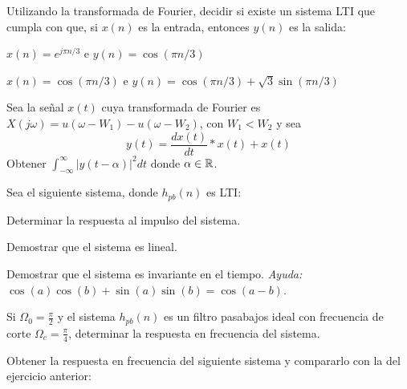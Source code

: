 \begin{ejercicio}
    Utilizando la transformada de Fourier, decidir si existe un sistema LTI que cumpla con que, si $x(n)$ es la entrada, entonces $y(n)$ es la salida:
    
    \inciso $x(n)= e^{j\pi n/3}$ e $y(n) = \cos(\pi n/3)$

    \inciso $x(n) = \cos(\pi n/3)$ e $y(n) = \cos(\pi n/3) + \sqrt{3} \sin(\pi n/3)$
\end{ejercicio}

\begin{ejercicio}
    Sea la señal $x(t)$ cuya transformada de Fourier es $X(j\omega) = u(\omega - W_1) - u(\omega - W_2)$, con $W_1 < W_2$ y sea 
    \begin{equation*}
        y(t) = \frac{dx(t)}{dt} * x(t) + x(t)
    \end{equation*}
    Obtener $\int_{-\infty}^{\infty} |y(t-\alpha)|^2 dt$ donde $\alpha \in \mathbb{R}$.
\end{ejercicio}

\begin{ejercicio}
    Sea el siguiente sistema, donde $h_{pb}(n)$ es LTI:
    \begin{center}
    \parbox{.7\textwidth}{}
    \end{center}

    \inciso Determinar la respuesta al impulso del sistema.

    \inciso Demostrar que el sistema es lineal.

    \inciso Demostrar que el sistema es invariante en el tiempo. \emph{Ayuda:} $\cos(a)\cos(b) + \sin(a)\sin(b) = \cos(a-b)$.

    \inciso Si $\Omega_0 = \frac{\pi}{2}$ y el sistema $h_{pb}(n)$ es un filtro pasabajos ideal con frecuencia de corte $\Omega_c = \frac{\pi}{4}$, determinar la respuesta en frecuencia del sistema.
\end{ejercicio}

\begin{ejercicio}
    Obtener la respuesta en frecuencia del siguiente sistema y compararlo con la del ejercicio anterior:
    \begin{center}
    \parbox{.7\textwidth}{}
    \end{center}
\end{ejercicio}
